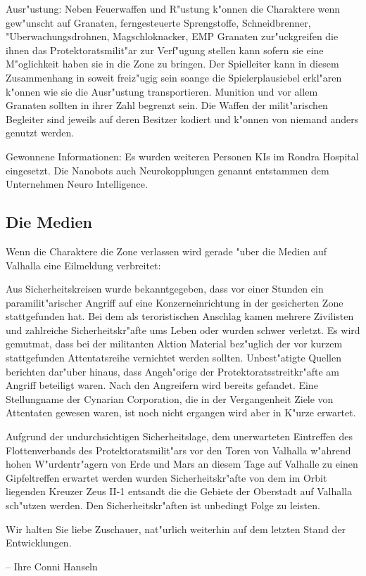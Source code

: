 \begin{remarks}
	Ausr"ustung: Neben Feuerwaffen und R"ustung k"onnen die Charaktere wenn gew"unscht auf Granaten, ferngesteuerte Sprengstoffe, Schneidbrenner, "Uberwachungsdrohnen, Magschlo\3knacker, EMP Granaten zur"uckgreifen die ihnen das Protektoratsmilit"ar zur Verf"ugung stellen kann sofern sie eine M"oglichkeit haben sie in die Zone zu bringen. Der Spielleiter kann in diesem Zusammenhang in soweit freiz"ugig sein soange die Spielerplausiebel erkl"aren k"onnen wie sie die Ausr"ustung transportieren. Munition und vor allem Granaten sollten in ihrer Zahl begrenzt sein. Die Waffen der milit"arischen Begleiter sind jeweils auf deren Besitzer kodiert und k"onnen von
	niemand anders genutzt werden.

	Gewonnene Informationen:  Es wurden weiteren Personen KIs im Rondra Hospital eingesetzt. Die Nanobots auch Neurokopplungen genannt entstammen dem Unternehmen Neuro Intelligence. 
\end{remarks}



\subsection{Die Medien} 
Wenn die Charaktere die Zone verlassen wird gerade "uber die Medien auf Valhalla eine Eilmeldung verbreitet:

\begin{speech}
Aus Sicherheitskreisen wurde bekanntgegeben, dass vor einer Stunden ein paramilit"arischer Angriff auf eine Konzerneinrichtung in der gesicherten Zone stattgefunden hat. Bei dem als teroristischen Anschlag kamen mehrere Zivilisten und zahlreiche Sicherheitskr"afte ums Leben oder wurden schwer verletzt. Es wird gemutma\3t, dass bei der militanten Aktion Material bez"uglich der vor kurzem stattgefunden Attentatsreihe vernichtet werden sollten. Unbest"atigte Quellen berichten dar"uber hinaus, dass Angeh"orige der Protektoratsstreitkr"afte am Angriff beteiligt waren. Nach den Angreifern wird bereits gefandet. Eine Stellungname der Cynarian Corporation, die in der Vergangenheit Ziele von Attentaten gewesen waren, ist noch nicht ergangen wird aber in K"urze erwartet.

Aufgrund der undurchsichtigen Sicherheitslage, dem unerwarteten Eintreffen des Flottenverbands des Protektoratsmilit"ars vor den Toren von Valhalla w"ahrend hohen W"urdentr"agern von Erde und Mars an diesem Tage auf Valhalle zu einen Gipfeltreffen erwartet werden wurden Sicherheitskr"afte von dem im Orbit liegenden Kreuzer Zeus II-1 entsandt die die Gebiete der Oberstadt auf Valhalla sch"utzen werden. Den Sicherheitskr"aften ist unbedingt Folge zu leisten.

Wir halten Sie liebe Zuschauer, nat"urlich weiterhin auf dem letzten Stand der Entwicklungen.

\nopagebreak
-- Ihre Conni Hanseln
\end{speech}

